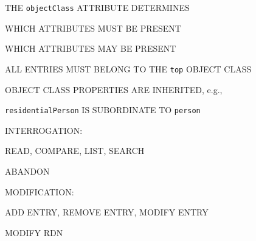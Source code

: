 \begin{bwslide}

\begin{nrtc}
\item	THE \verb"objectClass" ATTRIBUTE DETERMINES
    \begin{nrtc}
    \item	WHICH ATTRIBUTES MUST BE PRESENT

    \item	WHICH ATTRIBUTES MAY BE PRESENT
    \end{nrtc}

\item	ALL ENTRIES MUST BELONG TO THE \verb"top" OBJECT CLASS

\item	OBJECT CLASS PROPERTIES ARE INHERITED, e.g.,
    \begin{nrtc}
    \item	\verb"residentialPerson" IS SUBORDINATE TO \verb"person"
    \end{nrtc}
\end{nrtc}
\end{bwslide}






\begin{bwslide}

\begin{nrtc}
\item	INTERROGATION:
    \begin{nrtc}
    \item	READ, COMPARE, LIST, SEARCH

    \item	ABANDON
    \end{nrtc}

\item	MODIFICATION:
    \begin{nrtc}
    \item	ADD ENTRY, REMOVE ENTRY, MODIFY ENTRY

    \item	MODIFY RDN
    \end{nrtc}
\end{nrtc}
\end{bwslide}


